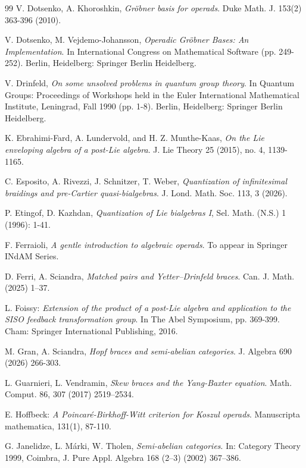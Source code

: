 \documentclass[10pt]{article}
\theoremstyle{definition}
\begin{document}
\begin{thebibliography}{99}
V. Dotsenko, A. Khoroshkin, \emph{Gr\"obner basis for operads}. Duke Math. J. 153(2) 363-396 (2010). %

V. Dotsenko, M. Vejdemo-Johansson, \emph{Operadic Gr\"obner Bases: An Implementation}. In International Congress on Mathematical Software (pp. 249-252). Berlin, Heidelberg: Springer Berlin Heidelberg.


V. Drinfeld, \emph{On some unsolved problems in quantum group theory}. In Quantum Groups: Proceedings of Workshops held in the Euler International Mathematical Institute, Leningrad, Fall
1990 (pp. 1-8). Berlin, Heidelberg: Springer Berlin Heidelberg.

K. Ebrahimi-Fard, A. Lundervold, and H. Z. Munthe-Kaas, 
\emph{On the Lie enveloping algebra of a post-Lie algebra}. J. Lie Theory 25 (2015), no. 4, 1139-1165.

C. Esposito, A. Rivezzi, J. Schnitzer, T. Weber, \emph{Quantization of infinitesimal braidings and pre-Cartier quasi-bialgebras}. J. Lond. Math. Soc. 113, 3 (2026).

P. Etingof, D. Kazhdan, \emph{Quantization of Lie bialgebras I}, Sel. Math. (N.S.) 1 (1996): 1-41.

F. Ferraioli, \emph{A gentle introduction to algebraic operads}. To appear in Springer INdAM Series.

D. Ferri, A. Sciandra, \emph{Matched pairs and Yetter--Drinfeld braces}. Can. J. Math. (2025) 1--37.

L. Foissy: \emph{Extension of the product of a post-Lie algebra and application to the SISO feedback transformation group}. In The Abel Symposium, pp. 369-399. Cham: Springer International Publishing, 2016.


M. Gran, A. Sciandra,  
\emph{Hopf braces and semi-abelian categories}. J. Algebra 690 (2026) 266-303.

L. Guarnieri, L. Vendramin, \emph{Skew braces and the Yang-Baxter equation}. Math. Comput. 86, 307 (2017) 2519--2534.

E. Hoffbeck: \emph{A Poincar\'e-Birkhoff-Witt criterion for Koszul operads}. Manuscripta mathematica, 131(1), 87-110.

G. Janelidze, L. M\'arki, W. Tholen, 
\emph{Semi-abelian categories}. In: Category Theory 1999, Coimbra,
J. Pure Appl. Algebra 168 (2--3) (2002) 367--386.


\end{thebibliography}
\end{document}

